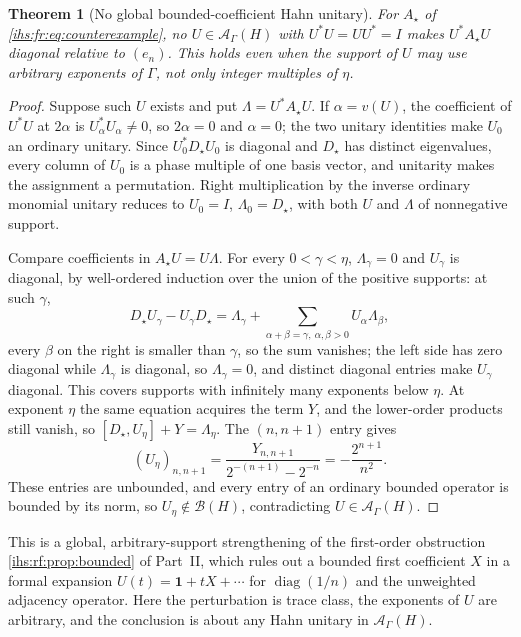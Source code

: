 \documentclass[11pt,a4paper]{article}
\numberwithin{equation}{section}
\newtheorem{theorem}{Theorem}[section]
\theoremstyle{definition}
\theoremstyle{remark}
\newcommand{\B}{\mathcal B(H)}
\newcommand{\Ahh}{\mathcal A_\Gamma(H)}
\newcommand{\diag}{\operatorname{diag}}
\newcommand{\Id}{\mathbf 1}
\begin{document}
\begin{theorem}[No global bounded-coefficient Hahn unitary]\label{ihs:fr:thm:nounitary}
For $A_\star$ of \eqref{ihs:fr:eq:counterexample}, no $U\in\Ahh$ with
$U^*U=UU^*=I$ makes $U^*A_\star U$ diagonal relative to $(e_n)$. This holds
even when the support of $U$ may use arbitrary exponents of $\Gamma$, not
only integer multiples of $\eta$.
\end{theorem}
\begin{proof}
Suppose such $U$ exists and put $\Lambda=U^*A_\star U$. If $\alpha=v(U)$,
the coefficient of $U^*U$ at $2\alpha$ is $U_\alpha^*U_\alpha\ne0$, so
$2\alpha=0$ and $\alpha=0$; the two unitary identities make $U_0$ an ordinary
unitary. Since $U_0^*D_\star U_0$ is diagonal and $D_\star$ has distinct
eigenvalues, every column of $U_0$ is a phase multiple of one basis vector,
and unitarity makes the assignment a permutation. Right multiplication by
the inverse ordinary monomial unitary reduces to $U_0=I$, $\Lambda_0=D_\star$,
with both $U$ and $\Lambda$ of nonnegative support.

Compare coefficients in $A_\star U=U\Lambda$. For every $0<\gamma<\eta$,
$\Lambda_\gamma=0$ and $U_\gamma$ is diagonal, by well-ordered induction over
the union of the positive supports: at such $\gamma$,
\[
 D_\star U_\gamma-U_\gamma D_\star=\Lambda_\gamma+
 \sum_{\alpha+\beta=\gamma,\ \alpha,\beta>0}U_\alpha\Lambda_\beta,
\]
every $\beta$ on the right is smaller than $\gamma$, so the sum vanishes; the
left side has zero diagonal while $\Lambda_\gamma$ is diagonal, so
$\Lambda_\gamma=0$, and distinct diagonal entries make $U_\gamma$ diagonal.
This covers supports with infinitely many exponents below $\eta$. At
exponent $\eta$ the same equation acquires the term $Y$, and the lower-order
products still vanish, so $[D_\star,U_\eta]+Y=\Lambda_\eta$. The $(n,n+1)$
entry gives
\begin{equation}\label{ihs:fr:eq:unboundedgenerator}
 (U_\eta)_{n,n+1}=\frac{Y_{n,n+1}}{2^{-(n+1)}-2^{-n}}=-\frac{2^{n+1}}{n^2}.
\end{equation}
These entries are unbounded, and every entry of an ordinary bounded operator
is bounded by its norm, so $U_\eta\notin\B$, contradicting $U\in\Ahh$.
\end{proof}

This is a global, arbitrary-support strengthening of the first-order
obstruction \cref{ihs:rf:prop:bounded} of Part~II, which rules out a bounded
first coefficient $X$ in a formal expansion $U(t)=\Id+tX+\cdots$ for
$\diag(1/n)$ and the unweighted adjacency operator. Here the perturbation is
trace class, the exponents of $U$ are arbitrary, and the conclusion is about
any Hahn unitary in $\Ahh$.
\end{document}
